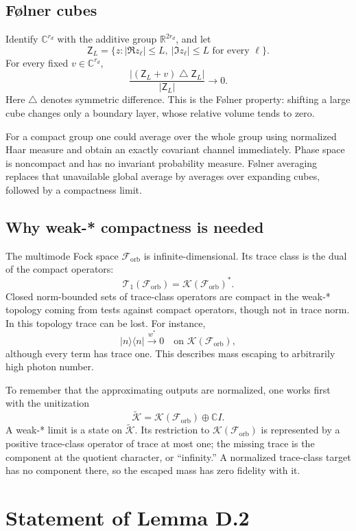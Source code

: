 \documentclass[11pt]{article}
\newcommand{\F}{\mathcal F_{\mathrm{orb}}}
\newcommand{\T}{\mathcal T_1}
\newcommand{\K}{\mathcal K}
\newcommand{\C}{\mathbb C}
\begin{document}
\subsection{F\o lner cubes}

Identify $\C^{r_d}$ with the additive group $\mathbb R^{2r_d}$, and let
\[
  \mathsf Z_L=
  \{z:|\Re z_\ell|\leq L,\ |\Im z_\ell|\leq L
  \text{ for every }\ell\}.
\]
For every fixed $v\in\C^{r_d}$,
\begin{equation}\label{eq:folner-property}
  \frac{|(\mathsf Z_L+v)\mathbin\triangle\mathsf Z_L|}
       {|\mathsf Z_L|}\longrightarrow0.
\end{equation}
Here $\triangle$ denotes symmetric difference.  This is the F\o lner
property: shifting a large cube changes only a boundary layer, whose relative
volume tends to zero.

For a compact group one could average over the whole group using normalized
Haar measure and obtain an exactly covariant channel immediately.  Phase
space is noncompact and has no invariant probability measure.  F\o lner
averaging replaces that unavailable global average by averages over expanding
cubes, followed by a compactness limit.

\subsection{Why weak-* compactness is needed}

The multimode Fock space $\F$ is infinite-dimensional.  Its trace class is
the dual of the compact operators:
\[
  \T(\F)=\K(\F)^*.
\]
Closed norm-bounded sets of trace-class operators are compact in the weak-*
topology coming from tests against compact operators, though not in trace
norm.  In this topology trace can be lost.  For instance,
\[
  |n\rangle\langle n|\stackrel{w^*}{\longrightarrow}0
  \quad\text{on }\K(\F),
\]
although every term has trace one.  This describes mass escaping to
arbitrarily high photon number.

To remember that the approximating outputs are normalized, one works first
with the unitization
\[
  \widetilde{\K}=\K(\F)\oplus\C I.
\]
A weak-* limit is a state on $\widetilde{\K}$.  Its restriction to
$\K(\F)$ is represented by a positive trace-class operator of trace at most
one; the missing trace is the component at the quotient character, or
``infinity.''  A normalized trace-class target has no component there, so
the escaped mass has zero fidelity with it.

\section{Statement of Lemma D.2}
\end{document}
